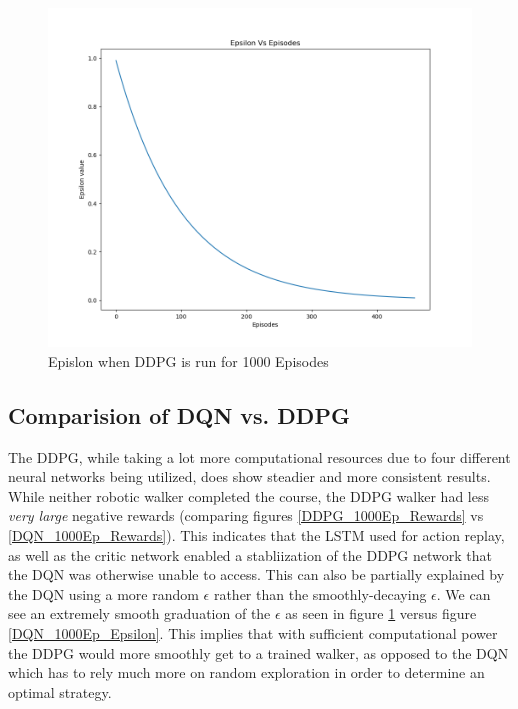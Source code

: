 \documentclass[doc, onecolumn, 12pt]{apa6}
\begin{document}
\begin{figure}
\label{DDPG_1000Ep_Epsilon}
\includegraphics[width =\textwidth, height=0.4 \textheight]{results/ddpg/1000_ep/Epsilon.png}
\caption{Epislon when DDPG is run for 1000 Episodes}
\end{figure}

\FloatBarrier 

\clearpage
\subsection{Comparision of DQN vs. DDPG}
The DDPG, while taking a lot more computational resources due to four different neural networks being utilized, does show steadier and more consistent results. While neither robotic walker completed the course, the DDPG walker had less \emph{very large} negative rewards (comparing figures \ref{DDPG_1000Ep_Rewards} vs \ref{DQN_1000Ep_Rewards}). This indicates that the LSTM used for action replay, as well as the critic network enabled a stabliization of the DDPG network that the DQN was otherwise unable to access. This can also be partially explained by the DQN using a more random $\epsilon$ rather than the smoothly-decaying $\epsilon$. We can see an extremely smooth graduation of the $\epsilon$ as seen in figure \ref{DDPG_1000Ep_Epsilon} versus figure \ref{DQN_1000Ep_Epsilon}. This implies that with sufficient computational power the DDPG would more smoothly get to a trained walker, as opposed to the DQN which has to rely much more on random exploration in order to determine an optimal strategy. 
\end{document}

